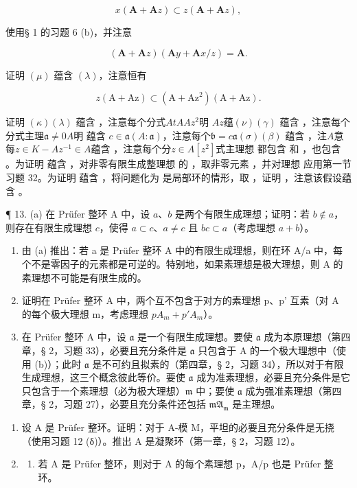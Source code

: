 \[
x (\mathbf {A} + \mathbf {A} z) \subset z (\mathbf {A} + \mathbf {A} z),
\]

使用§ 1 的习题 6 (b)，并注意

\[
(\mathbf {A} + \mathbf {A} z) (\mathbf {A} y + \mathbf {A} x / z) = \mathbf {A}.
\]

证明 \((\mu)\) 蕴含 \((\lambda)\)，注意恒有

\[
z (\mathrm{A} + \mathrm{Az}) \subset (\mathrm{A} + \mathrm{Az} ^ {2}) (\mathrm{A} + \mathrm{Az}).
\]

证明 \((\kappa)\)\((\lambda)\) 蕴含 ，注意每个分式\(A t\)\(A\)\(A z^2\)明  \(A z\)蕴\((\nu)\)\((\gamma)\) 蕴含 ，注意每个分式主理\(\mathfrak{a} \neq 0\)\(A\)明  蕴含 \(c \in \mathfrak{a}(A: \mathfrak{a})\)，注意每个\(\mathfrak{b} = c \mathfrak{a}\)\((\sigma)\)\((\beta)\) 蕴含 ，注\(A\)意每\(z \in K - A\)\(z^{-1} \in A\)蕴含 ，注意每个分\(z \in A[z^2]\)式主理想  都包含  和 ，也包含 。为证明  蕴含 ，对非零有限生成整理想  的 ，取非零元素 ，并对理想  应用第一节习题 32。为证明  蕴含 ，将问题化为  是局部环的情形，取 ，证明 ，注意该假设蕴含 。

¶ 13. (a) 在 Prüfer 整环 A 中，设 \(a\)、\(b\) 是两个有限生成理想；证明：若 \(b \notin a\)，则存在有限生成理想 \(c\)，使得 \(a \subset c\)、\(a \neq c\) 且 \(bc \subset a\)（考虑理想 \(a + b\)）。

\begin{enumerate}
\def\labelenumi{(\alph{enumi})}
\setcounter{enumi}{1}
\item
  由 (a) 推出：若 a 是 Prüfer 整环 A 中的有限生成理想，则在环 A/a 中，每个不是零因子的元素都是可逆的。特别地，如果素理想是极大理想，则 A 的素理想不可能是有限生成的。
\item
  证明在 Prüfer 整环 A 中，两个互不包含于对方的素理想 p、p' 互素（对 A 的每个极大理想 m，考虑理想 \(pA_{m} + p'A_{m}\)）。
\item
  在 Prüfer 整环 A 中，设 \(\mathfrak{a}\) 是一个有限生成理想。要使 \(\mathfrak{a}\) 成为本原理想（第四章，§ 2，习题 33），必要且充分条件是 \(\mathfrak{a}\) 只包含于 A 的一个极大理想中（使用 (b)）；此时 \(\mathfrak{a}\) 是不可约且拟素的（第四章，§ 2，习题 34），所以对于有限生成理想，这三个概念彼此等价。要使 \(\mathfrak{a}\) 成为准素理想，必要且充分条件是它只包含于一个素理想（必为极大理想）\(\mathfrak{m}\) 中；要使 \(\mathfrak{a}\) 成为强准素理想（第四章，§ 2，习题 27），必要且充分条件还包括 \(\mathfrak{mA}_{\mathfrak{m}}\) 是主理想。
\end{enumerate}

\begin{enumerate}
\def\labelenumi{\arabic{enumi}.}
\setcounter{enumi}{13}
\item
  设 A 是 Prüfer 整环。证明：对于 A-模 M，平坦的必要且充分条件是无挠（使用习题 12 (δ)）。推出 A 是凝聚环（第一章，§ 2，习题 12）。
\item
  \begin{enumerate}
  \def\labelenumii{(\alph{enumii})}
  \tightlist
  \item
    若 A 是 Prüfer 整环，则对于 A 的每个素理想 p，A/p 也是 Prüfer 整环。
  \end{enumerate}
\end{enumerate}

